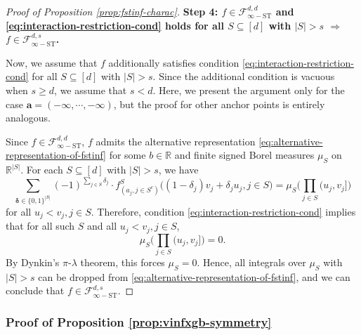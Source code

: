 \documentclass[10pt]{article}
\newcommand{\R}{{\mathbb R}}
\newcommand{\fstinf}{{\mathcal{F}^{d, s}_{\infty-\text{ST}}}}
\newcommand{\fstinfd}{{\mathcal{F}^{d, d}_{\infty-\text{ST}}}}
\newcommand{\abf}{{\mathbf{a}}}
\newcommand{\deltabf}{{\boldsymbol{\delta}}}
\begin{document}
\begin{proof}[Proof of Proposition \ref{prop:fstinf-charac}]
\textbf{Step 4: $f \in \fstinfd$ and \eqref{eq:interaction-restriction-cond} 
holds for all $S \subseteq [d]$ with $|S| > s$ $\Rightarrow$ $f \in \fstinf$.}

Now, we assume that $f$ additionally satisfies condition 
\eqref{eq:interaction-restriction-cond} for all $S \subseteq [d]$ with 
$|S| > s$. Since the additional condition is vacuous when $s \ge d$, we 
assume that $s < d$. Here, we present the argument only for the case 
$\abf = (-\infty, \cdots, -\infty)$, but the proof for other anchor 
points is entirely analogous.

Since $f \in \fstinfd$, $f$ admits the alternative representation 
\eqref{eq:alternative-representation-of-fstinf} for some $b \in \R$ and 
finite signed Borel measures $\mu_S$ on $\R^{|S|}$.
For each $S \subseteq [d]$ with $|S| > s$, we have
\begin{equation*}
    \sum_{\deltabf \in \{0, 1\}^{|S|}} (-1)^{\sum_{j \in S} \delta_j} 
    \cdot f^S_{(a_j, j \in S^c)}\big((1 - \delta_j) v_j 
    + \delta_j u_j, j \in S\big) 
    = \mu_S\Big(\prod_{j \in S} (u_j, v_j]\Big)
\end{equation*}
for all $u_j < v_j, j \in S$. Therefore, condition 
\eqref{eq:interaction-restriction-cond} implies that for all such $S$ 
and all $u_j < v_j, j \in S$,
\begin{equation*}
    \mu_S\Big(\prod_{j \in S} (u_j, v_j]\Big) = 0.
\end{equation*}
By Dynkin's $\pi$-$\lambda$ theorem, this forces $\mu_S = 0$.
Hence, all integrals over $\mu_S$ with $|S| > s$ can be 
dropped from \eqref{eq:alternative-representation-of-fstinf}, and we can 
conclude that $f \in \fstinf$.
\end{proof}



\subsubsection{Proof of Proposition \ref{prop:vinfxgb-symmetry}}
\label{pf:vinfxgb-symmetry}
\end{document}
